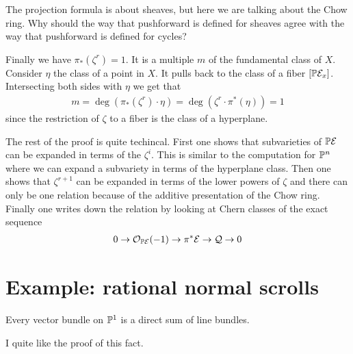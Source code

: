 \documentclass[12pt]{article}
\begin{document}
\begin{remark}
	The projection formula is about sheaves, but here we are talking about the Chow ring.
	Why should the way that pushforward is defined for sheaves agree with the
	way that pushforward is defined for cycles?\end{remark}

Finally we have $\pi_*(\zeta^r) = 1$. It is a multiple $m$ of the fundamental class of $X$.
Consider $\eta$ the class of a point in $X$. It pulls back to the class of a fiber
$[\P\cE_x]$. Intersecting both sides with $\eta$ we get that \begin{align*}
	m = \deg(\pi_*(\zeta^r)\cdot \eta) = \deg(\zeta^r\cdot \pi^*(\eta)) = 1
\end{align*} since the restriction of $\zeta$ to a fiber is the class of a hyperplane.

\hfill

The rest of the proof is quite techincal. First one shows that subvarieties of $\P\cE$ can 
be expanded in terms of the $\zeta^i$. This is similar to the computation for 
$\P^n$ where we can expand a subvariety in terms of the hyperplane class.
Then one shows that $\zeta^{r+1}$ can be 
expanded in terms of the lower powers of $\zeta$ and there can only be one relation
because of the additive presentation of the Chow ring. Finally one writes down the relation 
by looking at Chern classes of the exact sequence \begin{align*}
    0\to \cO_{\P\cE}(-1) \to \pi^*\cE \to \cQ \to 0
\end{align*} 

\section{Example: rational normal scrolls}

\begin{claim}
    Every vector bundle on $\P^1$ is a direct sum of line bundles.
\end{claim}

\begin{remark}
    I quite like the proof of this fact.
\end{remark}
\end{document}
